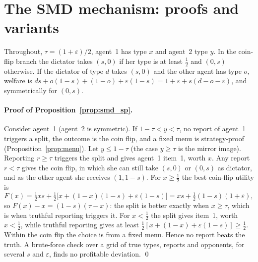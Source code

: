 \section{The SMD mechanism: proofs and variants}
\label{app:smd}

Throughout, $\tau=(1+\varepsilon)/2$, agent~1 has type $x$ and agent~2 type $y$. In the coin-flip branch
the dictator takes $(s,0)$ if her type is at least $\tfrac12$ and $(0,s)$ otherwise. If the dictator
of type $d$ takes $(s,0)$ and the other agent has type $o$, welfare is
$ds+o(1-s)+(1-o)+\varepsilon(1-s)=1+\varepsilon+s(d-o-\varepsilon)$, and symmetrically for $(0,s)$.

\paragraph{Proof of Proposition~\ref{prop:smd_sp}.} Consider agent~1 (agent~2 is symmetric). If $1-\tau<y<\tau$, no report
of agent~1 triggers a split, the outcome is the coin flip, and a fixed menu is strategy-proof
(Proposition~\ref{prop:menu}). Let $y\le1-\tau$ (the case $y\ge\tau$ is the mirror image). Reporting
$r\ge\tau$ triggers the split and gives agent~1 item~1, worth $x$. Any report $r<\tau$ gives the coin
flip, in which she can still take $(s,0)$ or $(0,s)$ as dictator, and as the other agent she receives
$(1,1-s)$. For $x\ge\tfrac12$ the best coin-flip utility is
\[
F(x)=\tfrac12xs+\tfrac12\big[x+(1-x)(1-s)+\varepsilon(1-s)\big]=xs+\tfrac12(1-s)(1+\varepsilon),
\]
so $F(x)-x=(1-s)(\tau-x)$: the split is better exactly when $x\ge\tau$, which is when truthful
reporting triggers it. For $x<\tfrac12$ the split gives item~1, worth $x<\tfrac12$, while truthful
reporting gives at least $\tfrac12[x+(1-x)+\varepsilon(1-s)]\ge\tfrac12$. Within the coin flip the
choice is from a fixed menu. Hence no report beats the truth. A brute-force check over a grid of
true types, reports and opponents, for several $s$ and $\varepsilon$, finds no profitable deviation. \qed

